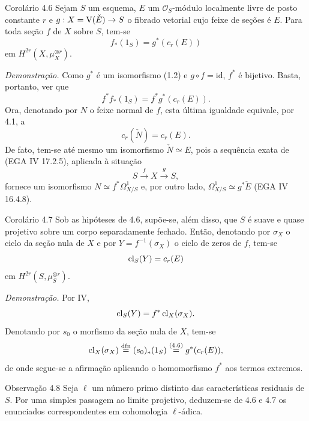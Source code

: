 \begin{statement}{Corolário 4.6}
Sejam $S$ um esquema, $E$ um $\mathcal O_S$-módulo localmente livre de posto constante $r$ e $g:X=\mathrm V(\check E)\to S$ o fibrado vetorial cujo feixe de seções é $E$. Para toda seção $f$ de $X$ sobre $S$, tem-se
\[
f_*(1_S)=g^*(c_r(E))
\]
em $H^{2r}(X,\mu_X^{\otimes r})$.
\end{statement}

\emph{Demonstração.} Como $g^*$ é um isomorfismo (1.2) e $g\circ f=\mathrm{id}$, $f^*$ é bijetivo. Basta, portanto, ver que
\[
f^*f_*(1_S)=f^*g^*(c_r(E)).
\]
Ora, denotando por $N$ o feixe normal de $f$, esta última igualdade equivale, por 4.1, a
\[
c_r(\check N)=c_r(E).
\]
De fato, tem-se até mesmo um isomorfismo $\check N\simeq E$, pois a sequência exata de (EGA IV 17.2.5), aplicada à situação
\[
S\xrightarrow{f} X\xrightarrow{g} S,
\]
fornece um isomorfismo $N\simeq f^*\Omega^1_{X/S}$ e, por outro lado, $\Omega^1_{X/S}\simeq g^*\check E$ (EGA IV 16.4.8).

\begin{statement}{Corolário 4.7}
Sob as hipóteses de 4.6, supõe-se, além disso, que $S$ é suave e quase projetivo sobre um corpo separadamente fechado. Então, denotando por $\sigma_X$ o ciclo da seção nula de $X$ e por $Y=f^{-1}(\sigma_X)$ o ciclo de zeros de $f$, tem-se
\[
\operatorname{cl}_S(Y)=c_r(E)
\]
em $H^{2r}(S,\mu_S^{\otimes r})$.
\end{statement}

\emph{Demonstração.} Por IV,
\[
\operatorname{cl}_S(Y)=f^*\operatorname{cl}_X(\sigma_X).
\]
Denotando por $s_0$ o morfismo da seção nula de $X$, tem-se
\[
\operatorname{cl}_X(\sigma_X)\stackrel{\mathrm{dfn}}{=}(s_0)_*(1_S)\stackrel{(4.6)}{=}g^*(c_r(E)),
\]
de onde segue-se a afirmação aplicando o homomorfismo $f^*$ aos termos extremos.

\begin{statement}{Observação 4.8}
Seja $\ell$ um número primo distinto das características residuais de $S$. Por uma simples passagem ao limite projetivo, deduzem-se de 4.6 e 4.7 os enunciados correspondentes em cohomologia $\ell$-ádica.
\end{statement}
